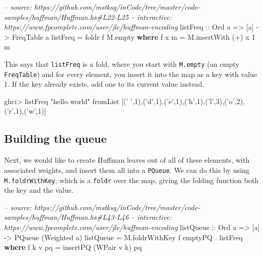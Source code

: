 \documentclass[]{article}
\newenvironment{Shaded}{}{}
\newcommand{\KeywordTok}[1]{\textcolor[rgb]{0.00,0.44,0.13}{\textbf{#1}}}
\newcommand{\DataTypeTok}[1]{\textcolor[rgb]{0.56,0.13,0.00}{#1}}
\newcommand{\DecValTok}[1]{\textcolor[rgb]{0.25,0.63,0.44}{#1}}
\newcommand{\CharTok}[1]{\textcolor[rgb]{0.25,0.44,0.63}{#1}}
\newcommand{\StringTok}[1]{\textcolor[rgb]{0.25,0.44,0.63}{#1}}
\newcommand{\CommentTok}[1]{\textcolor[rgb]{0.38,0.63,0.69}{\textit{#1}}}
\newcommand{\OtherTok}[1]{\textcolor[rgb]{0.00,0.44,0.13}{#1}}
\newcommand{\FunctionTok}[1]{\textcolor[rgb]{0.02,0.16,0.49}{#1}}
\newcommand{\NormalTok}[1]{#1}
\begin{document}
\begin{Shaded}
\begin{Highlighting}[]
\CommentTok{-- source: https://github.com/mstksg/inCode/tree/master/code-samples/huffman/Huffman.hs#L22-L25}
\CommentTok{-- interactive: https://www.fpcomplete.com/user/jle/huffman-encoding}
\OtherTok{listFreq ::} \DataTypeTok{Ord}\NormalTok{ a }\OtherTok{=>}\NormalTok{ [a] }\OtherTok{->} \DataTypeTok{FreqTable}\NormalTok{ a}
\NormalTok{listFreq }\FunctionTok{=}\NormalTok{ foldr f M.empty}
  \KeywordTok{where}
\NormalTok{    f x m }\FunctionTok{=}\NormalTok{ M.insertWith (}\FunctionTok{+}\NormalTok{) x }\DecValTok{1}\NormalTok{ m}
\end{Highlighting}
\end{Shaded}

This says that \texttt{listFreq} is a fold, where you start with
\texttt{M.empty} (an empty \texttt{FreqTable}) and for every element, you insert
it into the map as a key with value 1. If the key already exists, add one to its
current value instead.

\begin{Shaded}
\begin{Highlighting}[]
\NormalTok{ghci}\FunctionTok{>}\NormalTok{ listFreq }\StringTok{"hello world"}
\NormalTok{fromList [(}\CharTok{' '}\NormalTok{,}\DecValTok{1}\NormalTok{),(}\CharTok{'d'}\NormalTok{,}\DecValTok{1}\NormalTok{),(}\CharTok{'e'}\NormalTok{,}\DecValTok{1}\NormalTok{),(}\CharTok{'h'}\NormalTok{,}\DecValTok{1}\NormalTok{),(}\CharTok{'l'}\NormalTok{,}\DecValTok{3}\NormalTok{),(}\CharTok{'o'}\NormalTok{,}\DecValTok{2}\NormalTok{),(}\CharTok{'r'}\NormalTok{,}\DecValTok{1}\NormalTok{),(}\CharTok{'w'}\NormalTok{,}\DecValTok{1}\NormalTok{)]}
\end{Highlighting}
\end{Shaded}

\subsection{Building the queue}\label{building-the-queue}

Next, we would like to create Huffman leaves out of all of these elements, with
associated weights, and insert them all into a \texttt{PQueue}. We can do this
by using \texttt{M.foldrWithKey}, which is a \texttt{foldr} over the map, giving
the folding function both the key and the value.

\begin{Shaded}
\begin{Highlighting}[]
\CommentTok{-- source: https://github.com/mstksg/inCode/tree/master/code-samples/huffman/Huffman.hs#L43-L46}
\CommentTok{-- interactive: https://www.fpcomplete.com/user/jle/huffman-encoding}
\OtherTok{listQueue ::} \DataTypeTok{Ord}\NormalTok{ a }\OtherTok{=>}\NormalTok{ [a] }\OtherTok{->} \DataTypeTok{PQueue}\NormalTok{ (}\DataTypeTok{Weighted}\NormalTok{ a)}
\NormalTok{listQueue }\FunctionTok{=}\NormalTok{ M.foldrWithKey f emptyPQ }\FunctionTok{.}\NormalTok{ listFreq}
  \KeywordTok{where}
\NormalTok{    f k v pq }\FunctionTok{=}\NormalTok{ insertPQ (}\DataTypeTok{WPair}\NormalTok{ v k) pq}
\end{Highlighting}
\end{Shaded}
\end{document}
